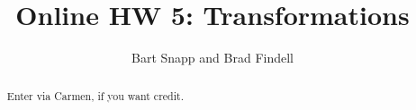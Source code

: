\documentclass[handout,space,nooutcomes]{xourse}
\title{Online HW 5: Transformations}
\author{Bart Snapp and Brad Findell}
\begin{document}
\begin{abstract}
Enter via Carmen, if you want credit.  
\end{abstract}
\maketitle

{}
\end{document}
